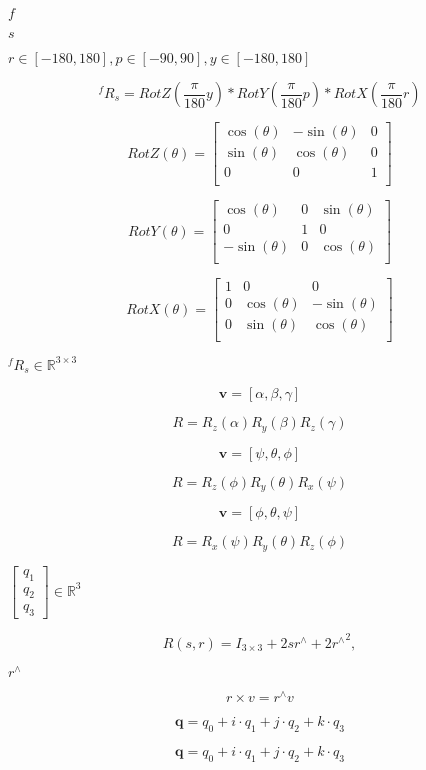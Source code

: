 \documentclass{article}
\begin{document}
$ f $
\pagebreak

$ s $
\pagebreak

$ r \in [-180, 180] , p \in [-90, 90], y \in [-180, 180]$
\pagebreak

\[
{}^f R_s = RotZ\left(\frac{\pi}{180}y\right)*RotY\left(\frac{\pi}{180}p\right)*RotX\left(\frac{\pi}{180}r\right)
\]
\pagebreak

\[
RotZ(\theta)
 =
 \begin{bmatrix}
     \cos(\theta)      & -\sin(\theta) & 0              \\
     \sin(\theta)      & \cos(\theta)  & 0              \\
     0                 & 0             & 1              \\
 \end{bmatrix}
\]
\pagebreak

\[
RotY(\theta)
=
 \begin{bmatrix}
     \cos(\theta)      & 0             & \sin(\theta)   \\
     0                 & 1             & 0              \\
     -\sin(\theta)     & 0             & \cos(\theta)   \\
 \end{bmatrix}
\]
\pagebreak

\[
RotX(\theta)
=
 \begin{bmatrix}
     1 & 0             & 0              \\
     0 & \cos(\theta)  & - \sin(\theta) \\
     0 & \sin(\theta)  & \cos(\theta)   \\
 \end{bmatrix}
\]
\pagebreak

$ {}^f R_s \in \mathbb{R}^{3 \times 3} $
\pagebreak

\[  \mathbf{v} = [\alpha, \beta, \gamma ]\]
\pagebreak

\[  R = R_z(\alpha) R_y(\beta) R_z(\gamma) \]
\pagebreak

\[  \mathbf{v} = [\psi, \theta, \phi ]\]
\pagebreak

\[  R = R_z(\phi) R_y(\theta) R_x(\psi) \]
\pagebreak

\[  \mathbf{v} = [\phi, \theta, \psi ]\]
\pagebreak

\[  R = R_x(\psi) R_y(\theta) R_z(\phi) \]
\pagebreak

$ \begin{bmatrix} q_1 \\ q_2 \\ q_3 \end{bmatrix} \in \mathbb{R}^3 $
\pagebreak

\[
  R(s,r) = I_{3\times3} + 2s r^{\wedge} + 2{r^\wedge}^2,
\]
\pagebreak

$ r^{\wedge} $
\pagebreak

\[
  r \times v = r^\wedge v
\]
\pagebreak

\[ \mathbf{q}=q_0 + i \cdot q_1 + j \cdot q_2 +
        k \cdot q_3 \]
\pagebreak

\[
        \mathbf{q}=q_0 + i \cdot q_1 + j \cdot q_2 + k \cdot
               q_3 \]
\pagebreak
\end{document}
